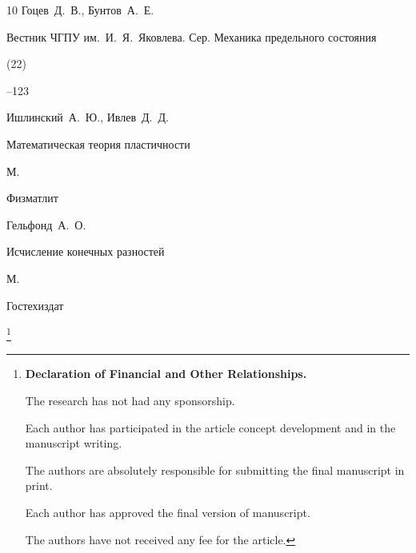 \begin{thebibliography}{10}
\by Гоцев~Д.~В., Бунтов~А.~Е.

\jour Вестник ЧГПУ им.~И.~Я.~Яковлева. Сер. Механика предельного состояния


 (22)

--123





\by Ишлинский~А.~Ю., Ивлев~Д.~Д.

\book Математическая теория пластичности

\publaddr М.

\publ Физматлит






\by Гельфонд~А.~О.

\book Исчисление конечных разностей

\publaddr М.

\publ Гостехиздат






\end{thebibliography}

\RuDate









\newpage



\makeentitle



\thanks{{\bf Declaration of Financial and Other Relationships.}

The research has not had any sponsorship.

Each author has participated in the article concept development and in the manuscript writing.

The authors are absolutely responsible for submitting the final manuscript in print.

Each author has approved the final version of manuscript.

The authors have not received any fee for the article.

}









